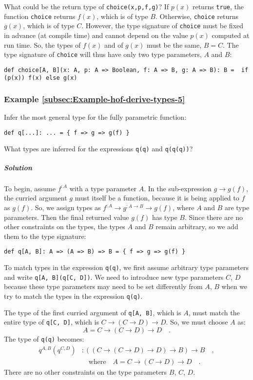 What could be the return type of \lstinline!choice(x,p,f,g)!? If
$p(x)$ returns \lstinline!true!, the function \lstinline!choice!
returns $f(x)$, which is of type $B$. Otherwise, \lstinline!choice!
returns $g(x)$, which is of type $C$. However, the type signature
of \lstinline!choice! must be fixed in advance (at compile time)
and cannot depend on the value $p(x)$ computed at run time. So, the
types of $f(x)$ and of $g(x)$ must be the same, $B=C$. The type
signature of \lstinline!choice! will thus have only two type parameters,
$A$ and $B$:
\begin{lstlisting}
def choice[A, B](x: A, p: A => Boolean, f: A => B, g: A => B): B =  if (p(x)) f(x) else g(x)
\end{lstlisting}


\subsubsection{Example \label{subsec:Example-hof-derive-types-5}\ref{subsec:Example-hof-derive-types-5}}

Infer the most general type for the fully parametric function:
\begin{lstlisting}
def q[...]: ... = { f => g => g(f) }
\end{lstlisting}
What types are inferred for the expressions \lstinline!q(q)! and
\lstinline!q(q(q))!?

\subparagraph{Solution}

To begin, assume $f^{:A}$ with a type parameter $A$. In the sub-expression
$g\rightarrow g(f)$, the curried argument $g$ must itself be a function,
because it is being applied to $f$ as $g(f)$. So, we assign types
as $f^{:A}\rightarrow g^{:A\rightarrow B}\rightarrow g(f)$, where
$A$ and $B$ are type parameters. Then the final returned value $g(f)$
has type $B$. Since there are no other constraints on the types,
the types $A$ and $B$ remain arbitrary, so we add them to the type
signature:
\begin{lstlisting}
def q[A, B]: A => (A => B) => B = { f => g => g(f) }
\end{lstlisting}

To match types in the expression \lstinline!q(q)!, we first assume
arbitrary type parameters and write \lstinline!q[A, B](q[C, D])!.
We need to introduce new type parameters $C$, $D$ because these
type parameters may need to be set differently from $A$, $B$ when
we try to match the types in the expression \lstinline!q(q)!.

The type of the first curried argument of \lstinline!q[A, B]!, which
is $A$, must match the entire type of \lstinline!q[C, D]!, which
is $C\rightarrow\left(C\rightarrow D\right)\rightarrow D$. So, we
must choose $A$ as:
\[
A=C\rightarrow\left(C\rightarrow D\right)\rightarrow D\quad.
\]
The type of \lstinline!q(q)! becomes:
\begin{align*}
q^{A,B}(q^{C,D}) & :\left(\left(C\rightarrow\left(C\rightarrow D\right)\rightarrow D\right)\rightarrow B\right)\rightarrow B\quad,\\
 & \quad\text{where}\quad A=C\rightarrow\left(C\rightarrow D\right)\rightarrow D\quad.
\end{align*}
There are no other constraints on the type parameters $B$, $C$,
$D$.


